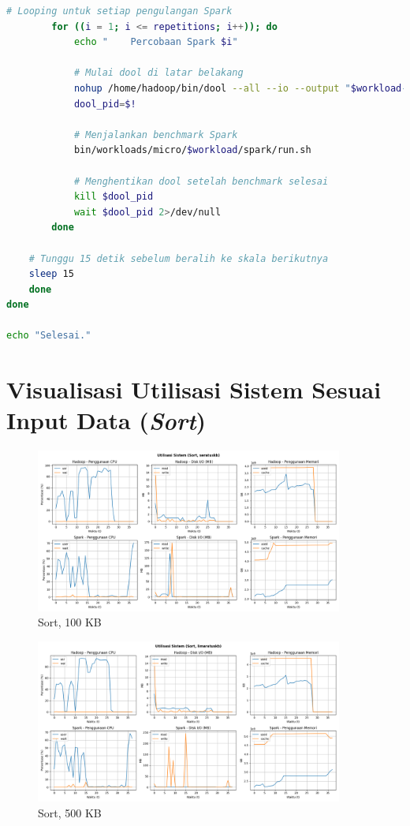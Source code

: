 \begin{lstlisting}[language=bash]
        # Looping untuk setiap pengulangan Spark
        for ((i = 1; i <= repetitions; i++)); do
            echo "    Percobaan Spark $i"

            # Mulai dool di latar belakang
            nohup /home/hadoop/bin/dool --all --io --output "$workload-$scale-$i-spark.csv" --bytes > /dev/null 2>&1 &
            dool_pid=$!

            # Menjalankan benchmark Spark
            bin/workloads/micro/$workload/spark/run.sh

            # Menghentikan dool setelah benchmark selesai
            kill $dool_pid
            wait $dool_pid 2>/dev/null
        done

	# Tunggu 15 detik sebelum beralih ke skala berikutnya
	sleep 15
    done
done

echo "Selesai."
\end{lstlisting}





\chapter{Visualisasi Utilisasi Sistem Sesuai Input Data (\textit{Sort})}
\label{appendix:G}

\begin{figure}[h]
    \centering
    \includegraphics[width=0.9\textwidth]{figures/ch04/5-util-sistem-sort-seratuskb.png}
    \caption*{Sort, 100 KB}
\end{figure}

\begin{figure}[h]
    \centering
    \includegraphics[width=0.9\textwidth]{figures/ch04/5-util-sistem-sort-limaratuskb.png}
    \caption*{Sort, 500 KB}
\end{figure}

